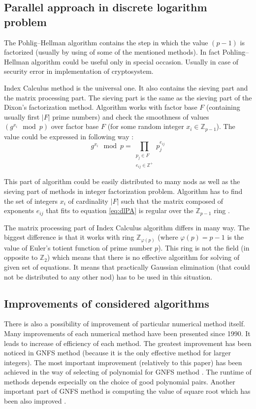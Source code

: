 \documentclass[conference]{IEEEtran}
\begin{document}
\subsection{Parallel approach in discrete logarithm problem}
The Pohlig--Hellman algorithm contains the step in which the value $(p-1)$ is factorized (usually by using of some of the mentioned methods). In fact Pohling--Hellman algorithm could be useful only in special occasion. Usually in case of security error in implementation of cryptosystem. 

Index Calculus method is the universal one. It also contains the sieving part and the matrix processing part. The sieving part is the same as the sieving part of the Dixon's factorization method. Algorithm works with factor base $F$ (containing usually first $|F|$ prime numbers) and check the smoothness of values $\left( g^{x_i} \mod p \right)$ over factor base $F$ (for some random integer $x_i \in \mathbb{Z}_{p - 1}$). The value could be expressed in following way \cite{yan}:
\begin{equation} \label{eq:dlPA}
g^{x_i} \mod p = \prod_{ \substack{p_j \in F \\ e_{ij} \in \mathbb{Z}^+} } p_j^{e_{ij}}
\end{equation}

This part of algorithm could be easily distributed to many nods as well as the sieving part of methods in integer factorization problem. Algorithm has to find the set of integers $x_i$ of cardinality $|F|$ such that the matrix composed of exponents $e_{ij}$ that fits to equation \eqref{eq:dlPA} is regular over the $\mathbb{Z}_{p-1}$ ring \cite{yan}.

The matrix processing part of Index Calculus algorithm differs in many way. The biggest difference is that it works with ring $\mathbb{Z}_{\varphi(p)}$ (where $\varphi(p)=p-1$ is the value of Euler's totient function of prime number $p$). This ring is not the field (in opposite to $\mathbb{Z}_2$) which means that there is no effective algorithm for solving of given set of equations. It means that practically Gaussian elimination (that could not be distributed to any other nod) has to be used in this situation.

\subsection{Improvements of considered algorithms}
There is also a possibility of improvement of particular numerical method itself. Many improvements of each numerical method have been presented since 1990. It leads to increase of efficiency of each method. The greatest improvement has been noticed in GNFS method (because it is the only effective method for larger integers). The most important improvement (relatively to this paper) has been achieved in the way of selecting of polynomial for GNFS method \cite{gireesh}. The runtime of methods depends especially on the choice of good polynomial pairs. Another important part of GNFS method is computing the value of square root which has been also improved \cite{nguyen}.
\end{document}
